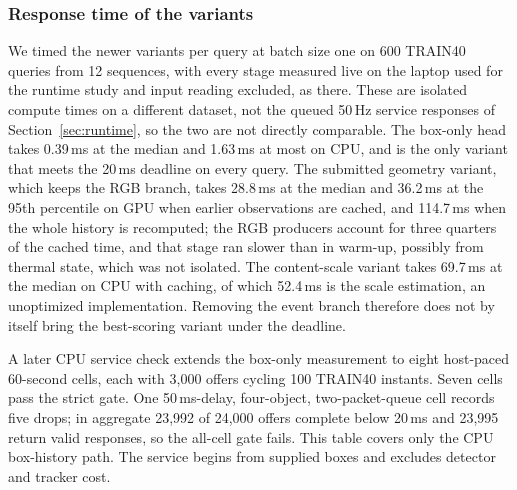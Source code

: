 \subsubsection{Response time of the variants}
\label{sec:followup-latency}
We timed the newer variants per query at batch size one on 600 TRAIN40 queries from 12 sequences, with every stage measured live on the laptop used for the runtime study and input reading excluded, as there. These are isolated compute times on a different dataset, not the queued 50\,Hz service responses of Section~\ref{sec:runtime}, so the two are not directly comparable. The box-only head takes 0.39\,ms at the median and 1.63\,ms at most on CPU, and is the only variant that meets the 20\,ms deadline on every query. The submitted geometry variant, which keeps the RGB branch, takes 28.8\,ms at the median and 36.2\,ms at the 95th percentile on GPU when earlier observations are cached, and 114.7\,ms when the whole history is recomputed; the RGB producers account for three quarters of the cached time, and that stage ran slower than in warm-up, possibly from thermal state, which was not isolated. The content-scale variant takes 69.7\,ms at the median on CPU with caching, of which 52.4\,ms is the scale estimation, an unoptimized implementation. Removing the event branch therefore does not by itself bring the best-scoring variant under the deadline.

A later CPU service check extends the box-only measurement to eight host-paced 60-second cells, each with 3,000 offers cycling 100 TRAIN40 instants. Seven cells pass the strict gate. One 50\,ms-delay, four-object, two-packet-queue cell records five drops; in aggregate 23,992 of 24,000 offers complete below 20\,ms and 23,995 return valid responses, so the all-cell gate fails. This table covers only the CPU box-history path. The service begins from supplied boxes and excludes detector and tracker cost.



